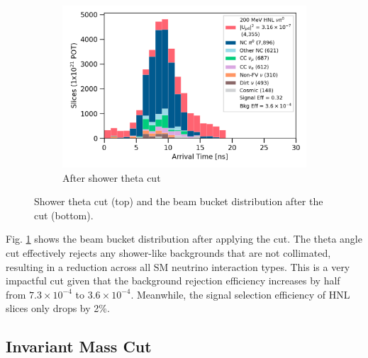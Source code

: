 \begin{figure}[b!]
\begin{subfigure}[b]{0.495\textwidth}
            \includegraphics[width=\textwidth]{beam_bucket_postshowertheta}
            \caption{After shower theta cut}%
	    \label{fig:bb_theta}
        \end{subfigure}
        \caption{
		Shower theta cut (top) and the beam bucket distribution after the cut (bottom). 
	}
        \label{fig:theta_cut}
\end{figure}

Fig. \ref{fig:bb_theta} shows the beam bucket distribution after applying the cut.
The theta angle cut effectively rejects any shower-like backgrounds that are not collimated, resulting in a reduction across all SM neutrino interaction types.
This is a very impactful cut given that the background rejection efficiency increases by half from $7.3 \times 10^{-4}$ to $3.6 \times 10^{-4}$.
Meanwhile, the signal selection efficiency of HNL slices only drops by 2\%.


\subsection{Invariant Mass Cut}
\label{sec:mass_cut}

